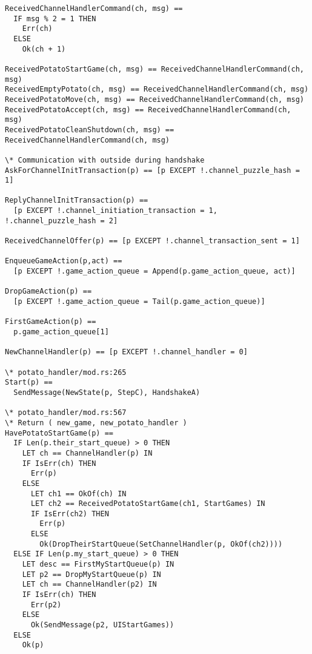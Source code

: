 \documentclass[a4paper]{article}
\begin{document}
\begin{multicols}{2}
\begin{verbatim}
ReceivedChannelHandlerCommand(ch, msg) ==
  IF msg % 2 = 1 THEN
    Err(ch)
  ELSE
    Ok(ch + 1)

ReceivedPotatoStartGame(ch, msg) == ReceivedChannelHandlerCommand(ch, msg)
ReceivedEmptyPotato(ch, msg) == ReceivedChannelHandlerCommand(ch, msg)
ReceivedPotatoMove(ch, msg) == ReceivedChannelHandlerCommand(ch, msg)
ReceivedPotatoAccept(ch, msg) == ReceivedChannelHandlerCommand(ch, msg)
ReceivedPotatoCleanShutdown(ch, msg) == ReceivedChannelHandlerCommand(ch, msg)

\* Communication with outside during handshake
AskForChannelInitTransaction(p) == [p EXCEPT !.channel_puzzle_hash = 1]

ReplyChannelInitTransaction(p) ==
  [p EXCEPT !.channel_initiation_transaction = 1, !.channel_puzzle_hash = 2]

ReceivedChannelOffer(p) == [p EXCEPT !.channel_transaction_sent = 1]

EnqueueGameAction(p,act) ==
  [p EXCEPT !.game_action_queue = Append(p.game_action_queue, act)]

DropGameAction(p) ==
  [p EXCEPT !.game_action_queue = Tail(p.game_action_queue)]

FirstGameAction(p) ==
  p.game_action_queue[1]

NewChannelHandler(p) == [p EXCEPT !.channel_handler = 0]

\* potato_handler/mod.rs:265
Start(p) ==
  SendMessage(NewState(p, StepC), HandshakeA)

\* potato_handler/mod.rs:567
\* Return ( new_game, new_potato_handler )
HavePotatoStartGame(p) ==
  IF Len(p.their_start_queue) > 0 THEN
    LET ch == ChannelHandler(p) IN
    IF IsErr(ch) THEN
      Err(p)
    ELSE
      LET ch1 == OkOf(ch) IN
      LET ch2 == ReceivedPotatoStartGame(ch1, StartGames) IN
      IF IsErr(ch2) THEN
        Err(p)
      ELSE
        Ok(DropTheirStartQueue(SetChannelHandler(p, OkOf(ch2))))
  ELSE IF Len(p.my_start_queue) > 0 THEN
    LET desc == FirstMyStartQueue(p) IN
    LET p2 == DropMyStartQueue(p) IN
    LET ch == ChannelHandler(p2) IN
    IF IsErr(ch) THEN
      Err(p2)
    ELSE
      Ok(SendMessage(p2, UIStartGames))
  ELSE
    Ok(p)


\end{verbatim}
\end{multicols}
\end{document}
